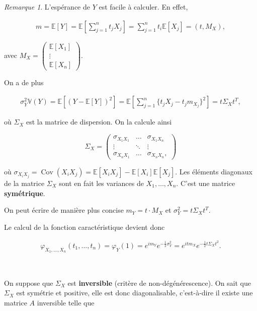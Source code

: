 \documentclass[french]{book}
\theoremstyle{definition}
\theoremstyle{remark}
\newtheorem*{remark}{Remarque}
\begin{document}
\begin{remark}
  L'espérance de \(Y\) est facile à calculer. En effet,

  \begin{gather*}
    m = \mathbb{E}[Y] = \mathbb{E}\left[\sum_{j=1}^{n} t_j X_j \right] = \sum_{j=1}^{n}t_i \mathbb{E}[X_j] = (t,M_X),
  \end{gather*}

  avec \(M_X = \begin{pmatrix}
  \mathbb{E}[X_1] \\
  \vdots \\
  \mathbb{E}[X_n]
  \end{pmatrix}\).

  On a de plus

  \begin{gather*}
    \sigma_Y ^2 \mathbb{V}(Y) = \mathbb{E}[(Y - \mathbb{E}[Y])^2] = \mathbb{E}\left[\sum_{j=1}^{n} \{ t_j X_j - t_j m _{X_j} \}^2\right] = t  \Sigma_{X} t ^{T},
  \end{gather*}

  où \(\Sigma_{X}\) est la matrice de dispersion. On la calcule ainsi

  \[\Sigma_X = \begin{pmatrix}
  \sigma _{X_1 X_1} & \dots & \sigma _{X_1 X_n} \\
  \vdots & \ddots & \vdots \\
  \sigma _{X_n X_1} & \dots & \sigma _{X_n X_n},
  \end{pmatrix}\]

  où \(\sigma _{X_i X_j} = \operatorname{Cov}(X_i X_j) = \mathbb{E}[X_i X_j] - \mathbb{E}[X_i]\mathbb{E}[X_j]\). Les éléments diagonaux de la matrice \(\Sigma_X\) sont en fait les variances de \(X_1, \dots, X_n\). C'est une matrice \textbf{symétrique}.

  On peut écrire de manière plus concise \(m_Y = t \cdot M_X\) et \(\sigma_Y ^2 = t \Sigma_X t ^{T}\).
\end{remark}

Le calcul de la fonction caractéristique devient donc

\begin{gather*}
  \varphi _{X_1, \dots, X_n}(t_1, \dots, t_n) = \varphi_Y(1) = e^{im_Y}e^{-\frac{1}{2}\sigma_Y ^2} = e^{it m_X} e^{-\frac{1}{2}t \Sigma_X t ^2}.
\end{gather*}

\

On suppose que \(\Sigma_X\) est \textbf{inversible} (critère de non-dégénérescence). On sait que \(\Sigma_X\) est symétrie et positive, elle est donc diagonalisable, c'est-à-dire il existe une matrice \(A\) inversible telle que
\end{document}
